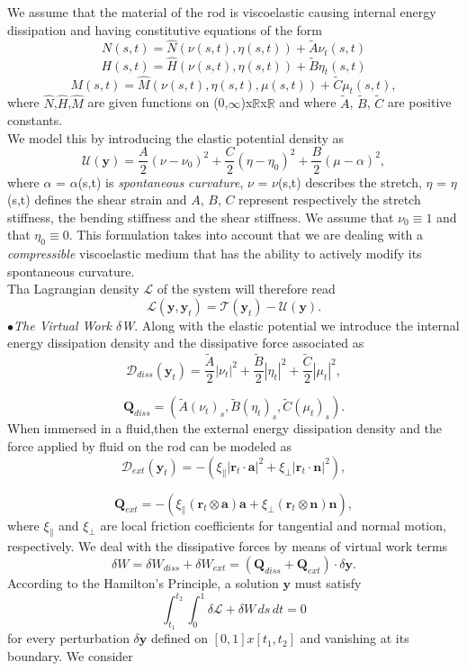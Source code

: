 \documentclass[12pt]{article}
\newcommand{\cB}{B}
\newcommand{\cA}{A}
\newcommand{\cC}{C}
\begin{document}
We assume that the material of the rod is viscoelastic causing internal energy dissipation and having constitutive equations of the form
\[  N (s,t)=  \hat{N}(\nu (s,t),\eta (s,t)) + \tilde{A} \nu_t (s,t)
\]
\[  H (s,t)=  \hat{H}(\nu (s,t),\eta (s,t)) + \tilde{B} \eta_t (s,t)
\]
\[  M (s,t)=  \hat{M}(\nu (s,t),\eta (s,t), \mu(s,t)) + \tilde{C} \mu_t (s,t),
\]
where $\hat{N}$,$\hat{H}$,$\hat{M}$ are given functions on (0,$\infty$)x$\mathbb{R}$x$\mathbb{R}$ and where $\tilde{A}$, $\tilde{B}$, $\tilde{C}$ are positive constants.
\\
We model this by introducing the elastic potential density  as
\[ \mathcal{U}(\mathbf{y}) = \frac{\cA}{2} (\nu - \nu_0)^2
+ \frac{\cC}{2} (\eta - \eta_0 )^2
+ \frac{\cB}{2} (\mu -\alpha)^2,
\]
where $\alpha$ = $\alpha$(s,t) is \emph{spontaneous curvature}, $\nu$ = $\nu$(s,t) describes the stretch, $\eta$ = $\eta$(s,t) defines the shear strain and $\cA$, $\cB$, $\cC$ represent respectively the stretch stiffness, the bending stiffness and the shear stiffness. We assume that $\nu_0\equiv1$ and that $\eta_0\equiv0$.
This formulation takes into account that we are dealing with a \emph{compressible} viscoelastic medium that has the ability to actively modify its spontaneous curvature.\\
Tha Lagrangian density $\mathcal{L}$ of the system will therefore read
\[ \mathcal{L}(\mathbf{y},\mathbf{y}_t)= \mathcal{T}(\mathbf{y}_t) - \mathcal{U}(\mathbf{y}).
\]
$\bullet$\emph{The Virtual Work $\delta$W}. Along with the elastic potential we introduce the internal energy dissipation density  and the dissipative force associated as 
\[ \mathcal{D}_{diss}(\mathbf{y}_t) = \frac{\tilde{A}}{2}\left|\nu_t\right|^2 + \frac{\tilde{B}}{2}\left|\eta_t\right|^2
+ \frac{\tilde{C}}{2}\left|\mu_t\right|^2,
\]

\[
\mathbf{Q}_{diss}= (\tilde{A}(\nu_t)_s,\tilde{B}(\eta_t)_s,\tilde{C}(\mu_t)_s).
\]
When immersed in a fluid,then the external energy dissipation density and the force applied by fluid on the rod can be modeled as
\[ \mathcal{D}_{ext}(\mathbf{y}_t)= -(\xi_\parallel\left|\mathbf{r}_t\cdot\mathbf{a}\right|^2 + \xi_\perp \left|\mathbf{r}_t\cdot\mathbf{n}\right|^2),
\]

\[\mathbf{Q}_{ext} = -( \xi_\parallel (\mathbf{r}_t\otimes\mathbf{a})\mathbf{a} + \xi_\perp (\mathbf{r}_t\otimes\mathbf{n})\mathbf{n}),
\]
where $\xi_\parallel$ and $\xi_\perp$ are local friction coefficients for tangential and normal motion, respectively.
We deal with the dissipative forces by means of virtual work terms
\[\delta W = \delta W_{diss} + \delta W_{ext} = (\mathbf{Q}_{diss}+\mathbf{Q}_{ext})\cdot\delta\mathbf{y}.
\]
According to the Hamilton's Principle, a solution $\mathbf{y}$ must satisfy
\[\int_{t_1}^{t_2} \int_{0}^{1} \delta \mathcal{L}+\delta W\, ds \, dt = 0
\]
for every perturbation $\delta \mathbf{y}$ defined on $[0,1]x[t_1,t_2]$ and vanishing at its boundary. We consider 
\end{document}
